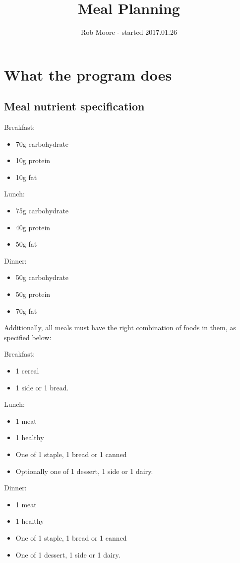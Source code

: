\documentclass[a4paper]{article}
\title{Meal Planning}
\author{Rob Moore - started 2017.01.26}
\begin{document}
\maketitle

\section{What the program does}

\subsection{Meal nutrient specification}

Breakfast:
\begin{itemize}
  \item 70g carbohydrate
  \item 10g protein
  \item 10g fat
\end{itemize}

Lunch:
\begin{itemize}
  \item 75g carbohydrate
  \item 40g protein
  \item 50g fat
\end{itemize}

Dinner:
\begin{itemize}
  \item 50g carbohydrate
  \item 50g protein
  \item 70g fat
\end{itemize}

Additionally, all meals must have the right combination of foods in them, as 
specified below:


Breakfast:
\begin{itemize}
  \item 1 cereal 
  \item 1 side or 1 bread.
\end{itemize}

Lunch:
\begin{itemize}
  \item 1 meat
  \item 1 healthy
  \item One of 1 staple, 1 bread or 1 canned 
  \item Optionally one of 1 dessert, 1 side or 1 dairy.
\end{itemize}

Dinner:
\begin{itemize}
  \item 1 meat
  \item 1 healthy
  \item One of 1 staple, 1 bread or 1 canned 
  \item One of 1 dessert, 1 side or 1 dairy.
\end{itemize}
\end{document}
